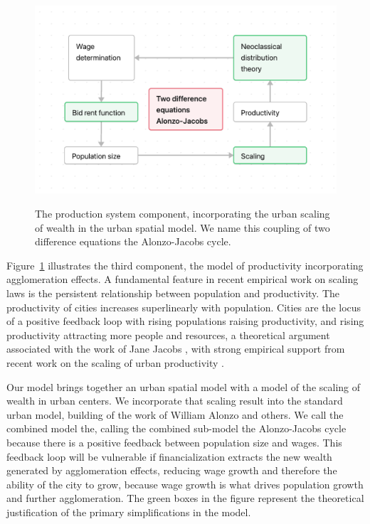 \begin{figure}[!ht]
\centering
\includegraphics[scale=.7]{fig/flow_alonzo-jacobs_cycle.png}
\label{fig-alonzo-jacobs-cycle}
\caption[Production system.]{The production system component, incorporating the urban scaling of wealth in the urban spatial model. We name this coupling of two difference equations the Alonzo-Jacobs cycle.}
\end{figure}

Figure~\ref{fig-alonzo-jacobs-cycle} illustrates the third component, the model of productivity incorporating agglomeration effects. A fundamental feature in recent empirical work on scaling laws is the persistent relationship between population and productivity. The productivity of cities increases superlinearly with population. Cities are the locus of a positive feedback loop with rising populations raising productivity, and rising productivity attracting more people and resources, a theoretical argument associated with the work of Jane Jacobs \cite{jacobsEconomyCities1969}, with strong empirical support from recent work on the scaling of urban productivity  \cite{bettencourtGrowthInnovationScaling2007, bettencourtOriginsScalingCities2013, dongUnderstandingMesoscopicScaling2020, loboUrbanScalingProduction2013}.

Our model brings together an urban spatial model with a model of the scaling of wealth in urban centers. We incorporate that scaling result into the standard urban model, building of the work of William Alonzo and others. We call the combined model the\cite{alonzoTheoryUrbanLand1960}, calling the combined sub-model the \gls{Alonzo-Jacobs cycle} because there is a positive feedback between population size and wages. This feedback loop will be vulnerable if financialization extracts the new wealth generated by agglomeration effects, reducing wage growth and therefore the ability of the city to grow, because wage growth is what drives population growth and further agglomeration. The green boxes in the figure represent the theoretical justification of the primary simplifications in the model. 

